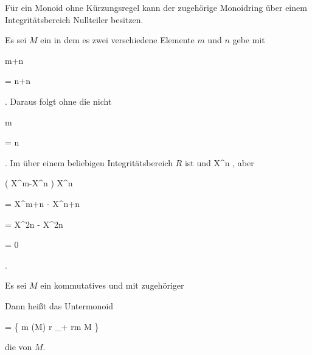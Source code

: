 Für ein Monoid ohne Kürzungsregel kann der zugehörige Monoidring über einem Integritätsbereich Nullteiler besitzen.



{


Es sei $M$ ein
in dem es zwei verschiedene Elemente $m$ und $n$ gebe mit


\mavergleichskette

{\vergleichskette

{ m+n
}

{ = }{ n+n
}

{  }{
}

{    }{
}

{   }{
}

}
{}{}{.}
Daraus folgt ohne die
nicht


\mavergleichskette

{\vergleichskette

{ m
}

{ = }{ n
}

{  }{
}

{    }{
}

{   }{
}

}
{}{}{.}
Im
über einem beliebigen Integritätsbereich $R$ ist   {  und  }  { X^n    }{ ,} aber


\mavergleichskettedisp

{\vergleichskette

{ \left(  X^m-X^n  \right) X^n
}

{ =} { X^{m+n} - X^{n+n}
}

{ =} { X^{2n} - X^{2n}
}

{ =} { 0
}

{ } {
}

}
{}{}{.}


}



{}

{


Es sei $M$ ein
kommutatives
und mit zugehöriger


 Dann heißt das Untermonoid


\mavergleichskettedisp

{\vergleichskette

{ 
}

{ =} { \left\{ m \in \Gamma(M)  \mid  {} r \in \N_+  rm \in M        \right\}
}

{ } {
}

{ } {
}

{ } {
}

}
{}{}{}
die  von $M$.


}


